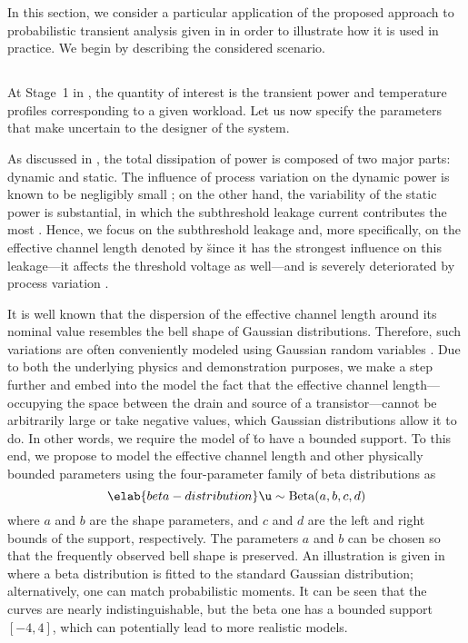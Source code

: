 In this section, we consider a particular application of the proposed approach
to probabilistic transient analysis given in  in
order to illustrate how it is used in practice. We begin by describing the
considered scenario.

\subsection{\problemtitle}

At Stage~1 in , the quantity of interest \g is the
transient power and temperature profiles corresponding to a given workload. Let
us now specify the parameters \vu that make \g uncertain to the designer of the
system.

As discussed in , the total dissipation of power is composed
of two major parts: dynamic and static. The influence of process variation on
the dynamic power is known to be negligibly small \cite{srivastava2010}; on the
other hand, the variability of the static power is substantial, in which the
subthreshold leakage current contributes the most \cite{juan2011, juan2012}.
Hence, we focus on the subthreshold leakage and, more specifically, on the
effective channel length denoted by \u since it has the strongest influence on
this leakage---it affects the threshold voltage as well---and is severely
deteriorated by process variation \cite{chandrakasan2000}.

It is well known that the dispersion of the effective channel length around its
nominal value resembles the bell shape of Gaussian distributions. Therefore,
such variations are often conveniently modeled using Gaussian random variables
\cite{bhardwaj2006, ghanta2006, huang2009a, shen2009, chandra2010,
srivastava2010, juan2011, juan2012, lee2013}. Due to both the underlying physics
and demonstration purposes, we make a step further and embed into the model the
fact that the effective channel length---occupying the space between the drain
and source of a transistor---cannot be arbitrarily large or take negative
values, which Gaussian distributions allow it to do. In other words, we require
the model of \u to have a bounded support. To this end, we propose to model the
effective channel length and other physically bounded parameters using the
four-parameter family of beta distributions as
\begin{equation} \elab{beta-distribution}
  \u \sim \mathrm{Beta}(a, b, c, d)
\end{equation}
where $a$ and $b$ are the shape parameters, and $c$ and $d$ are the left and
right bounds of the support, respectively. The parameters $a$ and $b$ can be
chosen so that the frequently observed bell shape is preserved. An illustration
is given in  where a beta distribution is fitted to
the standard Gaussian distribution; alternatively, one can match probabilistic
moments. It can be seen that the curves are nearly indistinguishable, but the
beta one has a bounded support $[-4, 4]$, which can potentially lead to more
realistic models.

